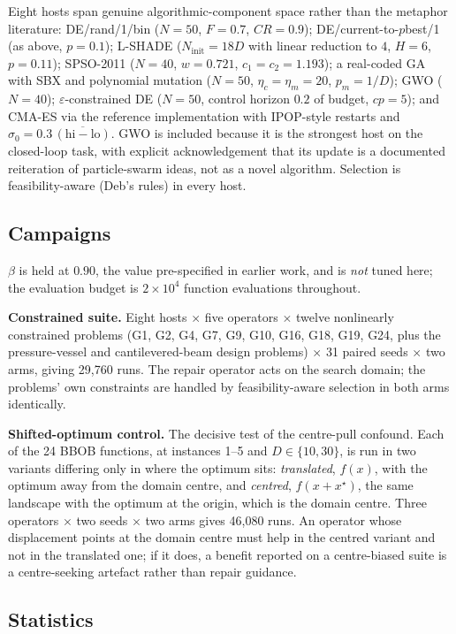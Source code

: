 Eight hosts span genuine algorithmic-component space rather than the metaphor
literature: DE/rand/1/bin ($N=50$, $F=0.7$, $CR=0.9$); DE/current-to-$p$best/1
(as above, $p=0.1$); L-SHADE ($N_{\text{init}}=18D$ with linear reduction to $4$,
$H=6$, $p=0.11$); SPSO-2011 ($N=40$, $w=0.721$, $c_1=c_2=1.193$); a real-coded GA
with SBX and polynomial mutation ($N=50$, $\eta_c=\eta_m=20$, $p_m=1/D$); GWO
($N=40$); $\varepsilon$-constrained DE ($N=50$, control horizon $0.2$ of budget,
$cp=5$); and CMA-ES via the reference implementation with IPOP-style restarts and
$\sigma_0 = 0.3\,\overline{(\text{hi}-\text{lo})}$. GWO is included because it is
the strongest host on the closed-loop task, with explicit acknowledgement that its
update is a documented reiteration of particle-swarm ideas, not as a novel
algorithm. Selection is feasibility-aware (Deb's rules) in every host.

\subsection{Campaigns}

$\beta$ is held at $0.90$, the value pre-specified in earlier work, and is
\emph{not} tuned here; the evaluation budget is $2\times10^4$ function evaluations
throughout.

\textbf{Constrained suite.} Eight hosts $\times$ five operators $\times$ twelve
nonlinearly constrained problems (G1, G2, G4, G7, G9, G10, G16, G18, G19, G24,
plus the pressure-vessel and cantilevered-beam design problems) $\times$ 31 paired
seeds $\times$ two arms, giving 29{,}760 runs. The repair operator acts on the
search domain; the problems' own constraints are handled by feasibility-aware
selection in both arms identically.

\textbf{Shifted-optimum control.} The decisive test of the centre-pull confound.
Each of the 24 BBOB functions, at instances 1--5 and $D \in \{10,30\}$, is run in
two variants differing only in where the optimum sits: \emph{translated},
$f(x)$, with the optimum away from the domain centre, and \emph{centred},
$f(x+x^{\star})$, the same landscape with the optimum at the origin, which is the
domain centre. Three operators $\times$ two seeds $\times$ two arms gives 46{,}080
runs. An operator whose displacement points at the domain centre must help in the
centred variant and not in the translated one; if it does, a benefit reported on a
centre-biased suite is a centre-seeking artefact rather than repair guidance.

\subsection{Statistics}

